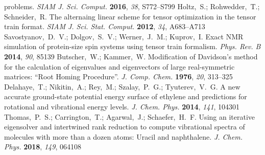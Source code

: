 \documentclass[journal=jctcce]{achemso}
\begin{document}
\begin{mcitethebibliography}{79}
{  problems}. \emph{SIAM J. Sci. Comput.} \textbf{2016}, \emph{38},
  S772--S799\relax
\mciteBstWouldAddEndPuncttrue
\mciteSetBstMidEndSepPunct{\mcitedefaultmidpunct}
{\mcitedefaultendpunct}{\mcitedefaultseppunct}\relax
\EndOfBibitem
{}
Holtz,~S.; Rohwedder,~T.; Schneider,~R. {The alternaing linear scheme for
  tensor optimization in the tensor train format}. \emph{SIAM J. Sci. Stat.
  Comput.} \textbf{2012}, \emph{34}, A683--A713\relax
\mciteBstWouldAddEndPuncttrue
\mciteSetBstMidEndSepPunct{\mcitedefaultmidpunct}
{\mcitedefaultendpunct}{\mcitedefaultseppunct}\relax
\EndOfBibitem
{}
Savostyanov,~D.~V.; Dolgov,~S.~V.; Werner,~J.~M.; Kuprov,~I. {Exact NMR
  simulation of protein-size spin systems using tensor train formalism}.
  \emph{Phys. Rev. B} \textbf{2014}, \emph{90}, 85139\relax
\mciteBstWouldAddEndPuncttrue
\mciteSetBstMidEndSepPunct{\mcitedefaultmidpunct}
{\mcitedefaultendpunct}{\mcitedefaultseppunct}\relax
\EndOfBibitem
{}
Butscher,~W.; Kammer,~W. {Modification of Davidson's method for the calculation
  of eigenvalues and eigenvectors of large real-symmetric matrices: ``Root
  Homing Procedure''}. \emph{J. Comp. Chem.} \textbf{1976}, \emph{20},
  313--325\relax
\mciteBstWouldAddEndPuncttrue
\mciteSetBstMidEndSepPunct{\mcitedefaultmidpunct}
{\mcitedefaultendpunct}{\mcitedefaultseppunct}\relax
\EndOfBibitem
{}
Delahaye,~T.; Nikitin,~A.; Rey,~M.; Szalay,~P.~G.; Tyuterev,~V.~G. {A new
  accurate ground-state potential energy surface of ethylene and predictions
  for rotational and vibrational energy levels}. \emph{J. Chem. Phys.}
  \textbf{2014}, \emph{141}, 104301\relax
\mciteBstWouldAddEndPuncttrue
\mciteSetBstMidEndSepPunct{\mcitedefaultmidpunct}
{\mcitedefaultendpunct}{\mcitedefaultseppunct}\relax
\EndOfBibitem
{}
Thomas,~P.~S.; Carrington,~T.; Agarwal,~J.; Schaefer,~H.~F. {Using an iterative
  eigensolver and intertwined rank reduction to compute vibrational spectra of
  molecules with more than a dozen atoms: Uracil and naphthalene}. \emph{J.
  Chem. Phys.} \textbf{2018}, \emph{149}, 064108\relax
\mciteBstWouldAddEndPuncttrue
\mciteSetBstMidEndSepPunct{\mcitedefaultmidpunct}

\end{mcitethebibliography}
\end{document}
